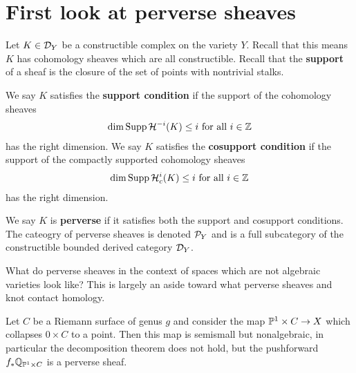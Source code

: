\documentclass[12pt]{article}
\begin{document}
\section{First look at perverse sheaves}
Let $K\in\cD_Y$ be a constructible complex on the variety $Y$. 
Recall that this means $K$ has cohomology sheaves which are all constructible.
Recall that the \textbf{support} of a sheaf is the closure of the set of points 
with nontrivial stalks. 

\begin{definition}
    We say $K$ satisfies 
    the \textbf{support condition} if the support of the cohomology sheaves
    \begin{align*}
        \dim{\Supp \cH^{-i}(K)} \leq i \text{ for all } i\in \Z
    \end{align*} has the right dimension. We say $K$
    satisfies the \textbf{cosupport condition} if the support of the compactly supported
    cohomology sheaves \begin{align*}
        \dim{\Supp \cH^{i}_c(K)} \leq i \text{ for all } i\in \Z
    \end{align*} has the right dimension.

    \hfill

    We say $K$ is \textbf{perverse} if it satisfies both the support and cosupport conditions.
    The cateogry of perverse sheaves is denoted $\cP_Y$ and is a full subcategory of 
    the constructible bounded derived category $\cD_Y$.
\end{definition}

\begin{remark}
    What do perverse sheaves in the context of 
    spaces which are not algebraic varieties look like?
    This is largely an aside toward what perverse sheaves 
    and knot contact homology.
\end{remark}

\begin{example}
    Let $C$ be a Riemann surface of genus $g$ and consider the map 
    $\P^1\times C \to X$ which collapses $0\times C$ to a point. Then this map
    is semismall but nonalgebraic, in particular the decomposition theorem does not hold, but
    the pushforward $f_*\Q_{\P^1\times C}$ is a perverse sheaf.
\end{example}
\end{document}

